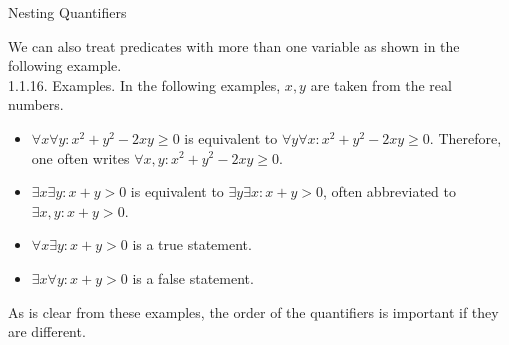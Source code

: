 \documentclass[smaller,hyperref={CJKbookmarks=true}]{beamer}
\begin{document}
\begin{frame}[c]{Nesting Quantifiers}
\begin{spacing}{1.1}
We can also treat predicates with more than one variable as shown in the
following example.\\[5pt]
\alert{1.1.16. Examples.} In the following examples, $x,y$ are taken from the real numbers.
\begin{itemize}
  \item $\forall x\forall y\!:x^2+y^2-2xy\geqslant0$ is equivalent to $\forall y\forall x\!:x^2+y^2-2xy\geqslant0$. Therefore, one often writes $\forall x,y\!:x^2+y^2-2xy\geqslant0$.
  \item $\exists x\exists y\!:x+y>0$ is equivalent to $\exists y\exists x\!:x+y>0$, often abbreviated to $\exists x,y\!:x+y>0$.
  \item $\forall x\exists y\!:x+y>0$ is a true statement.
  \item $\exists x\forall y\!:x+y>0$ is a false statement.
\end{itemize}
As is clear from these examples, the order of the quantifiers is important if
they are different.
\end{spacing}
\end{frame}
\end{document}

